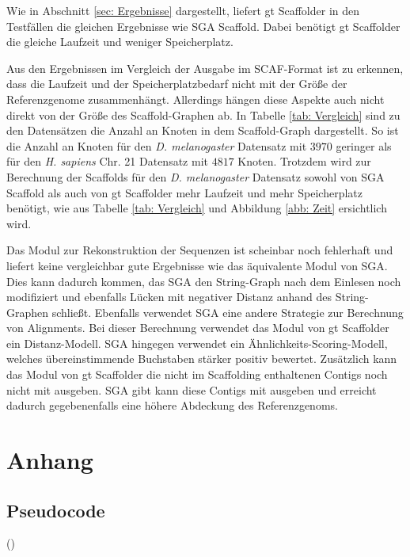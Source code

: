 \documentclass[a4paper,10pt,parskip]{scrartcl}
\begin{document}
Wie in Abschnitt \ref{sec: Ergebnisse} dargestellt, liefert gt
Scaffolder in den Testfällen die gleichen Ergebnisse wie SGA
Scaffold. Dabei benötigt gt Scaffolder die gleiche Laufzeit und
weniger Speicherplatz.

Aus den Ergebnissen im Vergleich der Ausgabe im SCAF-Format ist zu
erkennen, dass die Laufzeit und der Speicherplatzbedarf nicht mit der
Größe der Referenzgenome zusammenhängt. Allerdings hängen diese
Aspekte auch nicht direkt von der Größe des Scaffold-Graphen ab. In
Tabelle \ref{tab: Vergleich} sind zu den Datensätzen die Anzahl an
Knoten in dem Scaffold-Graph dargestellt. So ist die Anzahl an Knoten
für den \textit{D. melanogaster} Datensatz mit $3970$ geringer als für
den \textit{H. sapiens} Chr. 21 Datensatz mit $4817$ Knoten. Trotzdem
wird zur Berechnung der Scaffolds für den \textit{D. melanogaster}
Datensatz sowohl von SGA Scaffold als auch von gt Scaffolder mehr
Laufzeit und mehr Speicherplatz benötigt, wie aus Tabelle \ref{tab:
  Vergleich} und Abbildung \ref{abb: Zeit} ersichtlich wird.

Das Modul zur Rekonstruktion der Sequenzen ist scheinbar noch
fehlerhaft und liefert keine vergleichbar gute Ergebnisse wie das
äquivalente Modul von SGA. Dies kann dadurch kommen, das SGA den
String-Graph nach dem Einlesen noch modifiziert und ebenfalls Lücken
mit negativer Distanz anhand des String-Graphen schließt. Ebenfalls
verwendet SGA eine andere Strategie zur Berechnung von Alignments. Bei
dieser Berechnung verwendet das Modul von gt Scaffolder ein
Distanz-Modell. SGA hingegen verwendet ein
Ähnlichkeits-Scoring-Modell, welches übereinstimmende Buchstaben
stärker positiv bewertet. Zusätzlich kann das Modul von gt Scaffolder
die nicht im Scaffolding enthaltenen Contigs noch nicht mit
ausgeben. SGA gibt kann diese Contigs mit ausgeben und erreicht
dadurch gegebenenfalls eine höhere Abdeckung des Referenzgenoms.

\section*{Anhang}
\subsection*{Pseudocode}
()
\end{document}
